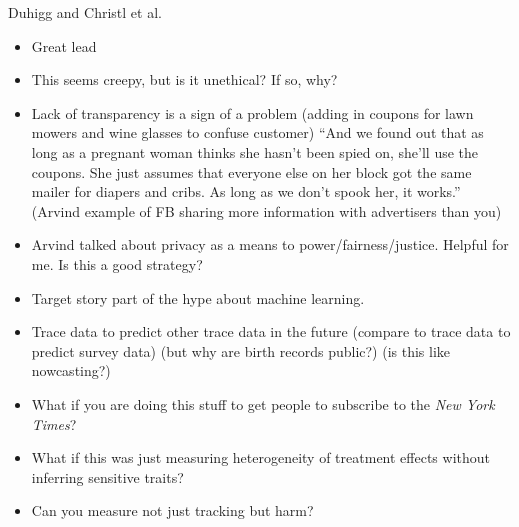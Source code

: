 \documentclass[aspectratio=169]{beamer}
\begin{document}
\begin{frame}

Duhigg and Christl et al.\
\begin{itemize}
\item Great lead
\pause
\item This seems creepy, but is it unethical? If so, why?
\pause
\item Lack of transparency is a sign of a problem (adding in coupons for lawn mowers and wine glasses to confuse customer) ``And we found out that as long as a pregnant woman thinks she hasn’t been spied on, she’ll use the coupons. She just assumes that everyone else on her block got the same mailer for diapers and cribs. As long as we don’t spook her, it works.''  (Arvind example of FB sharing more information with advertisers than you)
\pause
\item Arvind talked about privacy as a means to power/fairness/justice. Helpful for me. Is this a good strategy?
\pause 
\item Target story part of the hype about machine learning.
\pause
\item Trace data to predict other trace data in the future (compare to trace data to predict survey data) (but why are birth records public?) (is this like nowcasting?)
\pause
\item What if you are doing this stuff to get people to subscribe to the \textit{New York Times}?
\pause
\item What if this was just measuring heterogeneity of treatment effects without inferring sensitive traits?
\pause
\item Can you measure not just tracking but harm?
\end{itemize}

\end{frame}


\frame{\titlepage}
\end{document}
